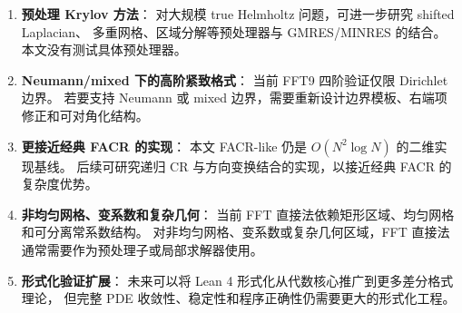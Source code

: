 \begin{enumerate}[itemsep=2pt]
  \item \textbf{预处理 Krylov 方法}：
        对大规模 true Helmholtz 问题，可进一步研究 shifted Laplacian、
        多重网格、区域分解等预处理器与 GMRES/MINRES 的结合。
        本文没有测试具体预处理器。

  \item \textbf{Neumann/mixed 下的高阶紧致格式}：
        当前 FFT9 四阶验证仅限 Dirichlet 边界。
        若要支持 Neumann 或 mixed 边界，需要重新设计边界模板、右端项修正和可对角化结构。

  \item \textbf{更接近经典 FACR 的实现}：
        本文 FACR-like 仍是 $O(N^2\log N)$ 的二维实现基线。
        后续可研究递归 CR 与方向变换结合的实现，以接近经典 FACR 的复杂度优势。

  \item \textbf{非均匀网格、变系数和复杂几何}：
        当前 FFT 直接法依赖矩形区域、均匀网格和可分离常系数结构。
        对非均匀网格、变系数或复杂几何区域，FFT 直接法通常需要作为预处理子或局部求解器使用。

  \item \textbf{形式化验证扩展}：
        未来可以将 Lean 4 形式化从代数核心推广到更多差分格式理论，
        但完整 PDE 收敛性、稳定性和程序正确性仍需要更大的形式化工程。
\end{enumerate}
